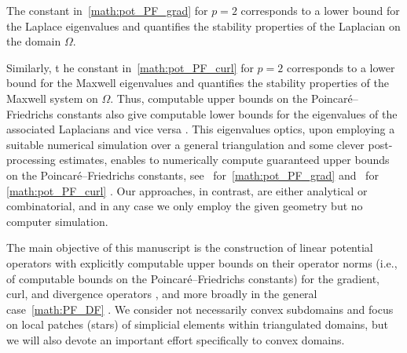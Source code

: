 \documentclass[10pt,a4paper]{article}
\newcommand\cye[1]{%
\protect\leavevmode
\begingroup
    \color{blue}%
    #1%
\endgroup
}
\begin{document}

\cye{The constant in~\eqref{math:pot_PF_grad} for $p=2$ corresponds to a lower bound for the Laplace eigenvalues and quantifies the stability properties of the Laplacian on the domain $\Omega$.} 
\cye{Similarly, t}he constant \cye{in~\eqref{math:pot_PF_curl} for $p=2$} corresponds to a lower bound for the Maxwell eigenvalues and quantifies the stability properties of the Maxwell system on $\Omega$. 
Thus, computable upper bounds on the Poincar\'e--Friedrichs constants also give computable lower bounds for the eigenvalues of the associated Laplacians \cye{and vice versa}. 
\cye{This eigenvalues optics, upon employing a suitable numerical simulation} over a general triangulation \cye{and some clever post-processing estimates, enables to numerically compute guaranteed upper bounds on the Poincar\'e--Friedrichs constants, see~\cite{Cars_Ged_LB_eigs_14,Liu_fram_eigs_15} for~\eqref{math:pot_PF_grad} and~\cite{gallistl2023computational} for \eqref{math:pot_PF_curl}}. \cye{Our approaches, in contrast, are either analytical or combinatorial, and in any case we only employ the given geometry but no computer simulation.}




The main objective of this manuscript is the construction of linear potential operators with explicitly computable upper bounds on their operator norms (i.e., of computable bounds on the Poincar\'e--Friedrichs constants) for the gradient, curl, and divergence operators\cye{, and more broadly in the general case~\eqref{math:PF_DF}}. 
\cye{We consider not necessarily} convex subdomains and focus on \cye{local patches (stars) of simplicial elements within triangulated domains, but we will also devote an important effort specifically to} convex domains. 

\end{document}

